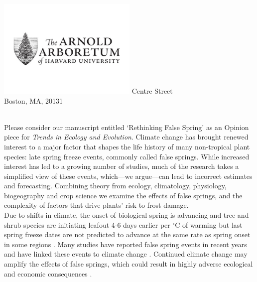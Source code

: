 \documentclass[11pt,a4paper]{article}\usepackage[]{graphicx}\usepackage[]{color}
\begin{document}
\includegraphics[width=0.5\textwidth, right]{AA_logo.jpg}
 Centre Street\\
\noindent Boston, MA, 20131\\


\vspace{1.5ex}




\vspace{3ex}\\
\noindent Please consider our manuscript entitled `Rethinking False Spring' as an Opinion piece for \textit{Trends in Ecology and Evolution}. Climate change has brought renewed interest to a major factor that shapes the life history of many non-tropical plant species: late spring freeze events, commonly called false springs. While increased interest has led to a growing number of studies, much of the research takes a simplified view of these events, which---we argue---can lead to incorrect estimates and forecasting. Combining theory from ecology, climatology, physiology, biogeography and crop science we examine the effects of false springs, and the complexity of factors that drive plants' risk to frost damage.\\

\noindent Due to shifts in climate, the onset of biological spring is advancing and tree and shrub species are initiating leafout 4-6 days earlier per $^{\circ}$C of warming \citep{Wolkovich2012, Polgar2014, Fu2015} but last spring freeze dates are not predicted to advance at the same rate as spring onset in some regions \citep{Labe2016}. Many studies have reported false spring events in recent years and have linked these events to climate change \citep[e.g.][]{Augspurger2013, Menzel2015}. Continued climate change may amplify the effects of false springs, which could result in highly adverse ecological and economic consequences \citep{Ault2013, Vitra2017}. \\
\end{document}

